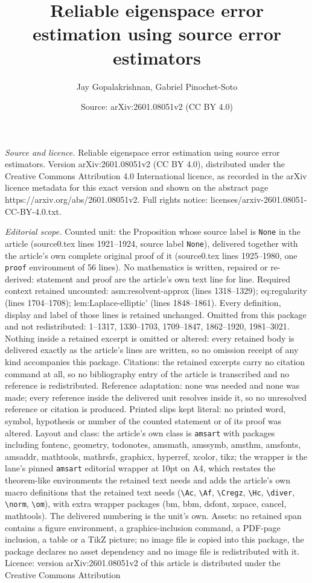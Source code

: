 \documentclass[10pt,a4paper]{amsart}
\title[Reliable eigenspace error estimation using source error esti]{Reliable eigenspace error estimation using source error estimators}
\author{Jay Gopalakrishnan, Gabriel Pinochet-Soto}
\date{Source: arXiv:2601.08051v2 (CC BY 4.0)}
\begin{document}
\maketitle

\noindent\emph{Source and licence.} Reliable eigenspace error estimation using source error estimators. Version arXiv:2601.08051v2 (CC BY 4.0), distributed under the Creative Commons Attribution 4.0 International licence, as recorded in the arXiv licence metadata for this exact version and shown on the abstract page https://arxiv.org/abs/2601.08051v2. Full rights notice: licenses/arxiv-2601.08051-CC-BY-4.0.txt.\par\smallskip

\noindent\textit{Editorial scope.} Counted unit: the Proposition whose source label is \texttt{None} in the article (source0.tex lines 1921--1924, source label \texttt{None}), delivered together with the article's own complete original proof of it (source0.tex lines 1925--1980, one \texttt{proof} environment of 56 lines). No mathematics is written, repaired or re-derived: statement and proof are the article's own text line for line. Required context retained uncounted: asm:resolvent-approx (lines 1318--1329); eq:regularity (lines 1704--1708); lem:Laplace-elliptic' (lines 1848--1861). Every definition, display and label of those lines is retained unchanged. Omitted from this package and not redistributed: 1--1317, 1330--1703, 1709--1847, 1862--1920, 1981--3021. Nothing inside a retained excerpt is omitted or altered: every retained body is delivered exactly as the article's lines are written, so no omission receipt of any kind accompanies this package. Citations: the retained excerpts carry no citation command at all, so no bibliography entry of the article is transcribed and no reference is redistributed. Reference adaptation: none was needed and none was made; every reference inside the delivered unit resolves inside it, so no unresolved reference or citation is produced. Printed slips kept literal: no printed word, symbol, hypothesis or number of the counted statement or of its proof was altered. Layout and class: the article's own class is \texttt{amsart} with packages including fontenc, geometry, todonotes, amsmath, amssymb, amsthm, amsfonts, amsaddr, mathtools, mathrsfs, graphicx, hyperref, xcolor, tikz; the wrapper is the lane's pinned \texttt{amsart} editorial wrapper at 10pt on A4, which restates the theorem-like environments the retained text needs and adds the article's own macro definitions that the retained text needs (\texttt{\textbackslash Ac}, \texttt{\textbackslash Af}, \texttt{\textbackslash Cregz}, \texttt{\textbackslash Hc}, \texttt{\textbackslash diver}, \texttt{\textbackslash norm}, \texttt{\textbackslash om}), with extra wrapper packages (bm, bbm, dsfont, xspace, cancel, mathtools). The delivered numbering is the unit's own. Assets: no retained span contains a figure environment, a graphics-inclusion command, a PDF-page inclusion, a table or a TikZ picture; no image file is copied into this package, the package declares no asset dependency and no image file is redistributed with it. Licence: version arXiv:2601.08051v2 of this article is distributed under the Creative Commons Attribution 
\end{document}
